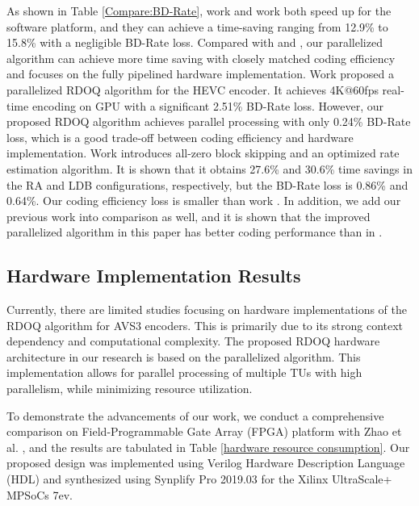 \documentclass[lettersize,journal]{IEEEtran}
\begin{document}
As shown in Table \ref{Compare:BD-Rate}, work \cite{lee2015fastquantizationmethod} and work \cite{xu2020simplifiedLevelEstimation} both speed up for the software platform, and they can achieve a time-saving ranging from 12.9\% to 15.8\% with a negligible BD-Rate loss. Compared with \cite{lee2015fastquantizationmethod} and \cite{xu2020simplifiedLevelEstimation}, our parallelized algorithm can achieve more time saving with closely matched coding efficiency and focuses on the fully pipelined hardware implementation. Work \cite{igarashi2018parallelGPU} proposed a parallelized RDOQ algorithm for the HEVC encoder. It achieves 4K@60fps real-time encoding on GPU with a significant 2.51\% BD-Rate loss. However, our proposed RDOQ algorithm achieves parallel processing with only 0.24\% BD-Rate loss, which is a good trade-off between coding efficiency and hardware implementation. Work \cite{xu2022hardwarefriendlyforrdoq} introduces all-zero block skipping and an optimized rate estimation algorithm. It is shown that it obtains 27.6\% and 30.6\% time savings in the RA and LDB configurations, respectively, but the BD-Rate loss is 0.86\% and 0.64\%. Our coding efficiency loss is smaller than work \cite{xu2022hardwarefriendlyforrdoq}. In addition, we add our previous work \cite{zhao2023scanline} into comparison as well, and it is shown that the improved parallelized algorithm in this paper has better coding performance than in \cite{zhao2023scanline}. 

\subsection{Hardware Implementation Results}
Currently, there are limited studies focusing on hardware implementations of the RDOQ algorithm for AVS3 encoders. This is primarily due to its strong context dependency and computational complexity. 
The proposed RDOQ hardware architecture in our research is based on the parallelized algorithm. This implementation allows for parallel processing of multiple TUs with high parallelism, while minimizing resource utilization. 

To demonstrate the advancements of our work, we conduct a comprehensive comparison on Field-Programmable Gate Array (FPGA) platform with Zhao et al. \cite{zhao2023scanline}, and the results are tabulated in Table \ref{hardware resource consumption}. Our proposed design was implemented using Verilog Hardware Description Language (HDL) and synthesized using Synplify Pro 2019.03 for the Xilinx UltraScale+ MPSoCs 7ev. 
\end{document}
